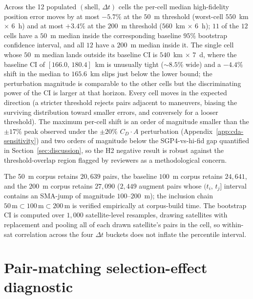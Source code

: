 \documentclass[10pt, letterpaper]{article}
\begin{document}
Across the 12 populated $(\mathrm{shell},\,\Delta t)$ cells the per-cell
median high-fidelity position error moves by at most $-5.7\%$ at the
$50$~m threshold (worst-cell $550$~km $\times$ $6$~h) and at most
$+3.4\%$ at the $200$~m threshold ($560$~km $\times$ $6$~h);
$11$ of the $12$ cells have a $50$~m median inside the corresponding
baseline $95\%$ bootstrap confidence interval, and all $12$ have a
$200$~m median inside it. The single cell whose $50$~m median lands
outside its baseline CI is $540$~km $\times$ $7$~d, where the
baseline CI of $[166.0,\,180.4]$~km is unusually tight ($\sim 8.5\%$
wide) and a $-4.4\%$ shift in the median to $165.6$~km slips just
below the lower bound; the perturbation magnitude is comparable to
the other cells but the discriminating power of the CI is larger at
that horizon. Every cell moves in the expected direction (a stricter
threshold rejects pairs adjacent to maneuvers, biasing the surviving
distribution toward smaller errors, and conversely for a looser
threshold). The maximum per-cell shift is an order of magnitude
smaller than the $\pm 17\%$ peak observed under the
$\pm 20\%$ $C_D \cdot A$ perturbation
(Appendix~\ref{app:cda-sensitivity}) and two orders of magnitude
below the SGP4-vs-hi-fid gap quantified in
Section~\ref{sec:discussion}, so the H2 negative result is robust
against the threshold-overlap region flagged by reviewers as a
methodological concern.

The 50~m corpus retains $20{,}639$ pairs, the baseline $100$~m corpus
retains $24{,}641$, and the $200$~m corpus retains $27{,}090$
($2{,}449$ augment pairs whose $(t_{i},\,t_{j}]$ interval contains
an SMA-jump of magnitude $100$--$200$~m); the inclusion chain
$50\,\text{m} \subset 100\,\text{m} \subset 200\,\text{m}$ is verified
empirically at corpus-build time. The bootstrap CI is computed over
$1{,}000$ satellite-level resamples, drawing satellites with
replacement and pooling all of each drawn satellite's pairs in the
cell, so within-sat correlation across the four $\Delta t$ buckets
does not inflate the percentile interval.

\section{Pair-matching selection-effect diagnostic}
\label{app:selection-effect}
\end{document}
